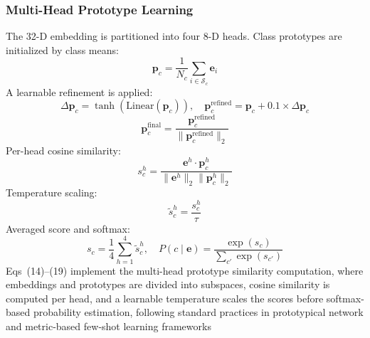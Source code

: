 \documentclass[10pt,letterpaper]{article}
\begin{document}
\subsubsection*{\textbf{Multi-Head Prototype Learning}}
The 32-D embedding is partitioned into four 8-D heads. Class prototypes are initialized by class means:
\begin{equation}
\mathbf{p}_c = \frac{1}{N_c}\sum_{i\in\mathcal{S}_c}\mathbf{e}_i
\end{equation}
A learnable refinement is applied:
\begin{equation}
\Delta \mathbf{p}_c = \tanh\left(\text{Linear}(\mathbf{p}_c)\right),\quad
\mathbf{p}_c^{\text{refined}} = \mathbf{p}_c + 0.1\times \Delta \mathbf{p}_c
\end{equation}
\begin{equation}
\mathbf{p}_c^{\text{final}} = \frac{\mathbf{p}_c^{\text{refined}}}{\|\mathbf{p}_c^{\text{refined}}\|_2}
\end{equation}
Per-head cosine similarity:
\begin{equation}
s_c^h = \frac{\mathbf{e}^h \cdot \mathbf{p}_c^h}{\|\mathbf{e}^h\|_2\|\mathbf{p}_c^h\|_2}
\end{equation}
Temperature scaling:
\begin{equation}
\tilde{s}_c^h = \frac{s_c^h}{\tau}
\end{equation}
Averaged score and softmax:
\begin{equation}
s_c = \frac{1}{4}\sum_{h=1}^{4}\tilde{s}_c^h,\quad
P(c \mid \mathbf{e}) = \frac{\exp(s_c)}{\sum_{c'}\exp(s_{c'})}
\end{equation}
Eqs~(14)--(19) implement the multi-head prototype similarity computation, where embeddings and prototypes are divided into subspaces, cosine similarity is computed per head, and a learnable temperature scales the scores before softmax-based probability estimation, following standard practices in prototypical network and metric-based few-shot learning frameworks~\cite{ref52}
 
\end{document}
